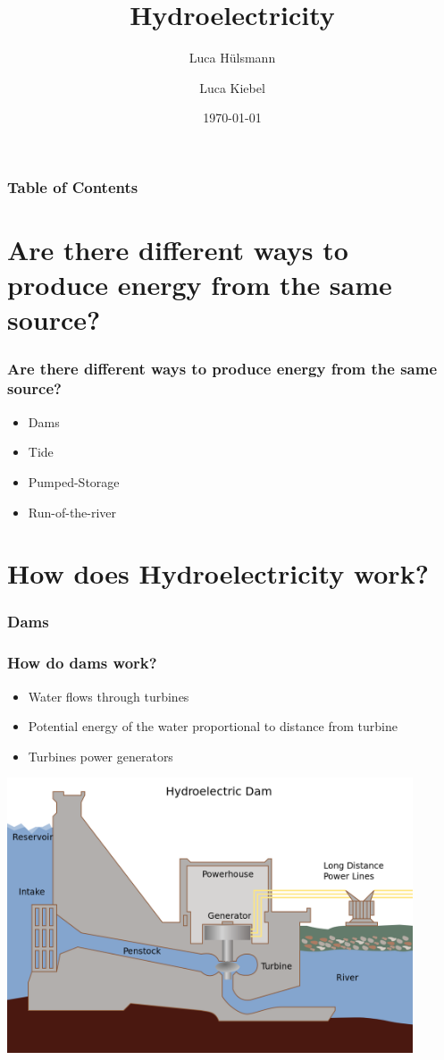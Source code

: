 \documentclass{beamer}
\begin{document}
\title{Hydroelectricity}
\author{Luca Hülsmann \and Luca Kiebel}
\date{\today}

\begin{frame}
\titlepage
\end{frame}

\begin{frame}
\frametitle{Table of Contents}\tableofcontents
\end{frame}

\section{Are there different ways to produce energy from the same source?}
\begin{frame}
\frametitle{Are there different ways to produce energy from the same source?}
\begin{itemize}
	\item Dams
	\item Tide
	\item Pumped-Storage
	\item Run-of-the-river
\end{itemize}
\end{frame}

\section{How does Hydroelectricity work?}

\subsubsection{Dams}
\begin{frame}
\frametitle{How do dams work?}
	\begin{itemize}
		\item Water flows through turbines
		\item Potential energy of the water proportional to distance from turbine
		\item Turbines power generators
	\end{itemize}
\end{frame}

\begin{frame}
\includegraphics[width=0.9\textwidth]{dam}
\end{frame}
\end{document}
